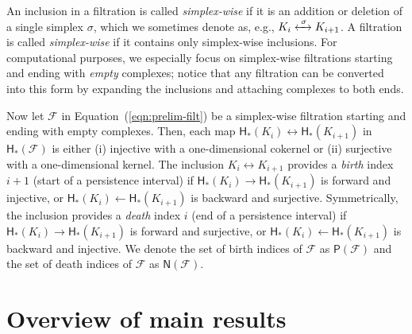 \documentclass[letterpaper,11pt]{article}
\theoremstyle{mythmstyle}
\theoremstyle{mydefstyle}
\theoremstyle{plain}
\theoremstyle{definition}
\newcommand{\Hm}{\mathsf{H}}
\newcommand{\pinds}{\mathsf{P}}
\newcommand{\ninds}{\mathsf{N}}
\newcommand{\<}[1]{\langle #1\rangle}
\newcommand{\lbarrowspace}{\;}
\newcommand{\lrarrowsp}[1]{\xleftrightarrow{\lbarrowspace#1\lbarrowspace}}
\let\leftrightarrowsp\lrarrowsp
\newcommand{\Fcal}{\mathcal{F}}
\newcommand{\sG}{\sigma}
\begin{document}
An inclusion in a filtration is called \emph{simplex-wise}
if it is an addition or deletion of a single simplex $\sG$,
which we sometimes denote as, e.g., $K_i\leftrightarrowsp{\sG}K_{i+1}$.
A filtration is called \emph{simplex-wise} if it contains only simplex-wise inclusions.
For computational purposes, we especially focus on 
simplex-wise filtrations
starting and ending with \emph{empty} complexes;
notice that any filtration can be converted into this form
by expanding the inclusions and attaching complexes to both ends.

Now let $\Fcal$ in Equation~(\ref{eqn:prelim-filt})
be a simplex-wise filtration starting and ending with 
empty complexes.
Then, each map $\Hm_*(K_i)\leftrightarrow \Hm_*(K_{i+1})$
in $\Hm_*(\Fcal)$ is either (i) injective with a one-dimensional cokernel
or (ii) surjective with a one-dimensional kernel.
The inclusion $K_i\leftrightarrow K_{i+1}$ provides
a \emph{birth} index $i+1$ (start of a persistence interval)
if 
$\Hm_*(K_i)\rightarrow \Hm_*(K_{i+1})$ is forward and injective,
or 
$\Hm_*(K_i)\leftarrow \Hm_*(K_{i+1})$ is backward and surjective.
Symmetrically, the inclusion provides
a \emph{death} index $i$ (end of a persistence interval)
if $\Hm_*(K_i)\rightarrow \Hm_*(K_{i+1})$ is forward and surjective,
or $\Hm_*(K_i)\leftarrow \Hm_*(K_{i+1})$ is backward and injective.
We denote the set of birth indices of $\Fcal$ as $\pinds(\Fcal)$
and the set of death indices of $\Fcal$ as $\ninds(\Fcal)$.



\section{Overview of main results}
\label{sec:overview}
\end{document}
